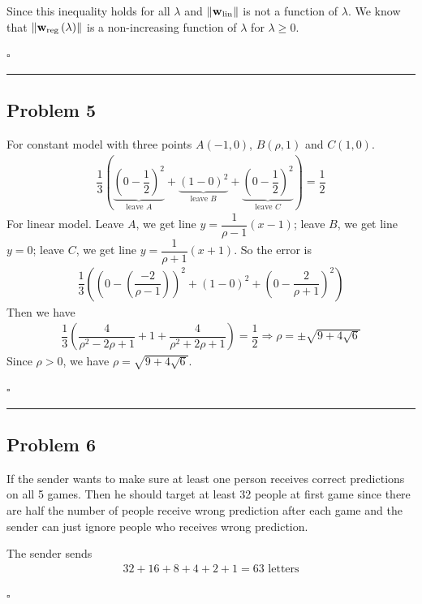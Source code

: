 \documentclass[12pt]{article}
\newcommand*{\QEDB}{\hfill\ensuremath{\square}}
\newcommand{\ParTh}[1]{\left(#1\right)}
\newcommand{\BF}[1]{{\bf#1}}
\newcommand{\VecAbsVal}[1]{\left\|#1\right\|}
\newcommand{\horrule}[1]{\rule{\linewidth}{#1}}
\begin{document}
Since this inequality holds for all $\lambda$ and $\VecAbsVal{\BF{w}_{\text{lin}}}$ is not a function of $\lambda$. We know that $\VecAbsVal{\BF{w}_{\text{reg}}\ParTh{\lambda}}$ is a non-increasing function of $\lambda$ for $\lambda\geq0$.

\QEDB

\horrule{0.5pt}

\subsection*{Problem 5}

For constant model with three points $A\ParTh{-1,0}$, $B\ParTh{\rho,1}$ and $C\ParTh{1,0}$.
\begin{align}
\dfrac{1}{3}\ParTh{\underbrace{\ParTh{0-\dfrac{1}{2}}^2}_{\text{leave }A}+\underbrace{\ParTh{1-0}^2}_{\text{leave }B}+\underbrace{\ParTh{0-\dfrac{1}{2}}^2}_{\text{leave }C}}=\dfrac{1}{2}
\end{align}
For linear model. Leave $A$, we get line $y=\dfrac{1}{\rho-1}\ParTh{x-1}$; leave $B$, we get line $y=0$; leave $C$, we get line $y=\dfrac{1}{\rho+1}\ParTh{x+1}$. So the error is
\begin{align}
\dfrac{1}{3}\ParTh{\ParTh{0-\ParTh{\dfrac{-2}{\rho-1}}}^2+\ParTh{1-0}^2+\ParTh{0-\dfrac{2}{\rho+1}}^2}
\end{align}
Then we have
\begin{align}
\dfrac{1}{3}\ParTh{\dfrac{4}{{\rho^2-2\rho+1}}+1+\dfrac{4}{{\rho^2+2\rho+1}}}=\dfrac{1}{2}\Rightarrow\rho=\pm\sqrt{9+4\sqrt{6}}
\end{align}
Since $\rho>0$, we have $\rho=\sqrt{9+4\sqrt{6}}$.

\QEDB

\horrule{0.5pt}

\subsection*{Problem 6}

If the sender wants to make sure at least one person receives correct predictions on all 5 games. Then he should target at least 32 people at first game since there are half the number of people receive wrong prediction after each game and the sender can just ignore people who receives wrong prediction.

The sender sends
\begin{align}
32+16+8+4+2+1=63\text{ letters}
\end{align}

\QEDB
\end{document}
